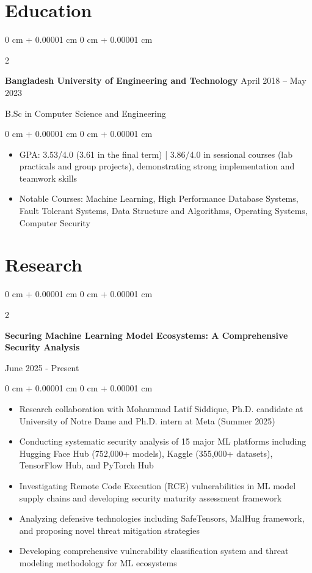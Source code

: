 \documentclass[10pt, letterpaper]{article}
\newenvironment{highlights}{
    \begin{itemize}[
        topsep=0.10 cm,
        parsep=0.10 cm,
        partopsep=0pt,
        itemsep=0pt,
        leftmargin=0 cm + 10pt
    ]
}{
    \end{itemize}
} %
\newenvironment{onecolentry}{
    \begin{adjustwidth}{
        0 cm + 0.00001 cm
    }{
        0 cm + 0.00001 cm
    }
}{
    \end{adjustwidth}
} %
\newenvironment{twocolentry}[2][]{
    \onecolentry
    \def\secondColumn{#2}
    \setcolumnwidth{\fill, 4.5 cm}
    \begin{paracol}{2}
}{
    \switchcolumn \raggedleft \secondColumn
    \end{paracol}
    \endonecolentry
} %
\begin{document}
        \vspace{0.2 cm}
    
    \section{Education}
 
        \begin{twocolentry}{
            April 2018 – May 2023
        }
            \textbf{Bangladesh University of Engineering and Technology}\end{twocolentry}
        B.Sc in Computer Science and Engineering


        \vspace{0.10 cm}
        \begin{onecolentry}
            \begin{highlights}
                \item GPA: 3.53/4.0 (3.61 in the final term) | 3.86/4.0 in sessional courses (lab practicals and group projects), demonstrating strong implementation and teamwork skills
                \item Notable Courses: Machine Learning, High Performance Database Systems, Fault Tolerant Systems, Data Structure and Algorithms, Operating Systems, Computer Security
                \end{highlights}
        \end{onecolentry}
                
        
    \section{Research}

\begin{twocolentry}{
    June 2025 - Present
}
\textbf{Securing Machine Learning Model Ecosystems: A Comprehensive Security Analysis}
\end{twocolentry}

\begin{onecolentry}
    \begin{highlights}
        \item Research collaboration with Mohammad Latif Siddique, Ph.D. candidate at University of Notre Dame and Ph.D. intern at Meta (Summer 2025)
        \item Conducting systematic security analysis of 15 major ML platforms including Hugging Face Hub (752,000+ models), Kaggle (355,000+ datasets), TensorFlow Hub, and PyTorch Hub
        \item Investigating Remote Code Execution (RCE) vulnerabilities in ML model supply chains and developing security maturity assessment framework
        \item Analyzing defensive technologies including SafeTensors, MalHug framework, and proposing novel threat mitigation strategies
        \item Developing comprehensive vulnerability classification system and threat modeling methodology for ML ecosystems
    \end{highlights}
\end{onecolentry}
\end{document}
